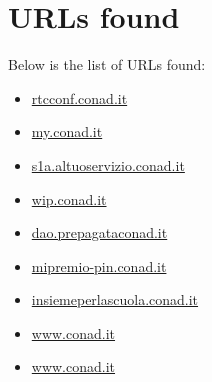 \documentclass{article}
\begin{document}
\section*{URLs found}

Below is the list of URLs found:

\begin{itemize}
    
        
        
        \item \href{ http://rtcconf.conad.it }{ rtcconf.conad.it }
    
        
        
        \item \href{ https://my.conad.it/login.html?cb=https:/vincinatale.conad.it }{ my.conad.it }
    
        
        
        \item \href{ https://s1a.altuoservizio.conad.it/chiusuratemporanea.html }{ s1a.altuoservizio.conad.it }
    
        
        
        \item \href{ http://wip.conad.it/ }{ wip.conad.it }
    
        
        
        \item \href{ https://dao.prepagataconad.it/ }{ dao.prepagataconad.it }
    
        
        
        \item \href{ http://mipremio-pin.conad.it/ }{ mipremio-pin.conad.it }
    
        
        
        \item \href{ https://insiemeperlascuola.conad.it/atpc/insiemeperlascuola/j/home }{ insiemeperlascuola.conad.it }
    
        
        
        \item \href{ https://www.conad.it/esperienze-di-gusto.html }{ www.conad.it }
    
        
        
        \item \href{ https://www.conad.it/carte-e-premi?utm\_campaign=sitelink\&utm\_source=google\&utm\_medium=cpc\&utm\_source=google\&utm\_medium=cpc\&utm\_campaign=cnd\_wpp\_conad\_search\&s\_kwcid=AL\%2113157\%213\%21528959599834\%21e\%21\%21g\%21\%21premi+conad\&gad\_source=1\&gclid=EAIaIQobChMI76fVy4GygwMVeZmDBx3UvwasEAAYASABEgI5f\_D\_BwE }{ www.conad.it }
    

\end{itemize}
\end{document}
